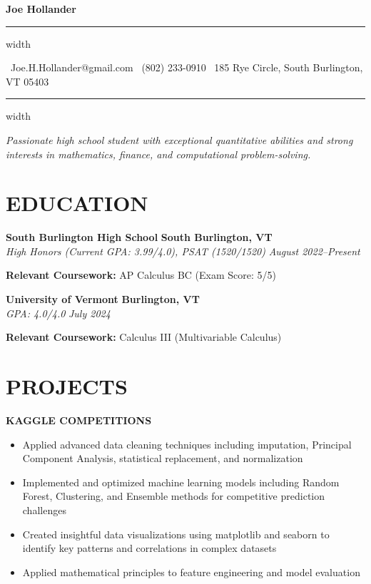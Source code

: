 \documentclass[11pt,letterpaper]{article}
\newcommand{\name}[1]{
  \begin{center}
    \Huge\textbf{\color{headingcolor}#1}
  \end{center}
  \vspace{-0.5em}
  \hrule height 0.8pt width \textwidth
  \vspace{0.5em}
}
\newcommand{\contact}[3]{
  \begin{center}
    \faEnvelope\ #1 \hspace{1em} \faPhone\ #2 \hspace{1em} \faMapMarker*\ #3
  \end{center}
  \vspace{-0.5em}
  \hrule height 0.4pt width \textwidth
  \vspace{0.5em}
}
\newcommand{\role}[4]{
  \begin{center}
  \textbf{\color{subheadingcolor}#1} \hfill \textbf{#2} \\
  \textit{#3} \hfill \textit{#4}
  \end{center}
}
\begin{document}
\name{Joe Hollander}
\vspace{-0.5em}
\contact{Joe.H.Hollander@gmail.com}{(802) 233-0910}{185 Rye Circle, South Burlington, VT 05403}

\vspace{-0.5em}
\begin{center}
\textit{Passionate high school student with exceptional quantitative abilities and strong interests in mathematics, finance, and computational problem-solving.}
\end{center}

\section{EDUCATION}

\vspace{0.5em}
\role{South Burlington High School}{South Burlington, VT}{High Honors (Current GPA: 3.99/4.0), PSAT (1520/1520)}{August 2022--Present}   
\begin{flushleft}
\textbf{Relevant Coursework:} AP Calculus BC (Exam Score: 5/5)
\end{flushleft}

\role{University of Vermont}{Burlington, VT}{GPA: 4.0/4.0}{July 2024}
\begin{flushleft}
\textbf{Relevant Coursework:} Calculus III (Multivariable Calculus)
\end{flushleft}

\vspace{3mm}
\section{PROJECTS}
\vspace{1em}

\begin{flushleft}
\textbf{\color{subheadingcolor}KAGGLE COMPETITIONS}
\begin{itemize}[leftmargin=*,nosep]
    \item Applied advanced data cleaning techniques including imputation, Principal Component Analysis, statistical replacement, and normalization
    \item Implemented and optimized machine learning models including Random Forest, Clustering, and Ensemble methods for competitive prediction challenges
    \item Created insightful data visualizations using matplotlib and seaborn to identify key patterns and correlations in complex datasets
    \item Applied mathematical principles to feature engineering and model evaluation
\end{itemize}
\end{flushleft}
\end{document}
